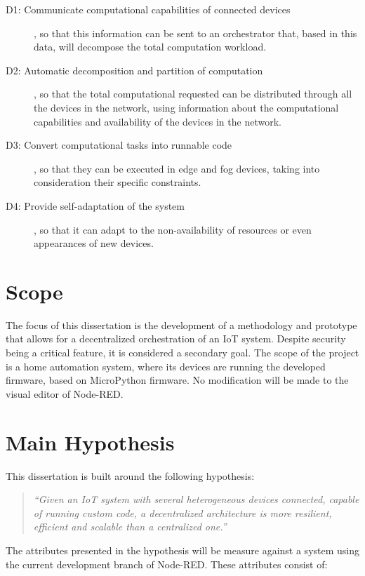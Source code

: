 \begin{description}
    \item [D1: Communicate computational capabilities of connected devices], so that this information can be sent to an orchestrator that, based in this data, will decompose the total computation workload.
    \item [D2: Automatic decomposition and partition of computation], so that the total computational requested can be distributed through all the devices in the network, using information about the computational capabilities and availability of the devices in the network.
    \item [D3: Convert computational tasks into runnable code], so that they can be executed in edge and fog devices, taking into consideration their specific constraints.
    \item [D4: Provide self-adaptation of the system], so that it can adapt to the non-availability of resources or even appearances of new devices.
\end{description}

\section{Scope}\label{sec:scope}

The focus of this dissertation is the development of a methodology and prototype that allows for a decentralized orchestration of an IoT system. Despite security being a critical feature, it is considered a secondary goal. The scope of the project is a home automation system, where its devices are running the developed firmware, based on MicroPython firmware. No modification will be made to the visual editor of Node-RED.

\section{Main Hypothesis}\label{sec:main_hypothesis}

This dissertation is built around the following hypothesis:

\begin{quote}
    \emph{``Given an IoT system with several heterogeneous devices connected, capable of running custom code, a decentralized architecture is more resilient, efficient and scalable than a centralized one.''}
\end{quote}

The attributes presented in the hypothesis will be measure against a system using the current development branch of Node-RED. These attributes consist of:

